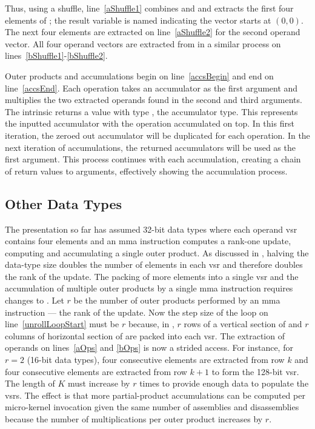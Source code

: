 \documentclass[\main/thesis.tex]{subfiles}
\begin{document}
Thus, using a shuffle, line~\ref{aShuffle1} combines  and  and extracts the first four elements of ; the result variable is named  indicating the vector starts at $(0, 0)$.
The next four elements are extracted on line~\ref{aShuffle2} for the second operand vector.
All four operand vectors are extracted from  in a similar process on lines~\ref{bShuffle1}-\ref{bShuffle2}.

Outer products and accumulations begin on line~\ref{accsBegin} and end on line~\ref{accsEnd}.
Each operation takes an accumulator as the first argument and multiplies the two extracted operands found in the second and third arguments.
The  intrinsic returns a value with type , the accumulator type.
This represents the inputted accumulator with the operation accumulated on top.
In this first iteration, the zeroed out accumulator will be duplicated for each operation.
In the next iteration of accumulations, the returned accumulators will be used as the first argument.
This process continues with each accumulation, creating a chain of return values to arguments, effectively showing the accumulation process.

\subsection{Other Data Types}
\label{sec:dataTypes}
The presentation so far has assumed 32-bit data types where each operand \gls{vsr} contains four elements and an \gls{mma} instruction computes a rank-one update, computing and accumulating a single outer product.
As discussed in , halving the data-type size doubles the number of elements in each \gls{vsr} and therefore doubles the rank of the update.
The packing of more elements into a single \gls{vsr} and the accumulation of multiple outer products by a single \gls{mma} instruction requires changes to .
Let $r$ be the number of outer products performed by an \gls{mma} instruction --- \ie the rank of the update.
Now the step size of the loop on line~\ref{unrollLoopStart} must be $r$ because, in , $r$ rows of a vertical section of  and $r$ columns of horizontal section of  are packed into each \gls{vsr}.
The extraction of operands on lines~\ref{aOps} and \ref{bOps} is now a strided access.
For instance, for $r=2$ (16-bit data types), four consecutive elements are extracted from row $k$ and four consecutive elements are extracted from row $k+1$ to form the 128-bit \gls{vsr}.
The length of $K$ must increase by $r$ times to provide enough data to populate the \glspl{vsr}.
The effect is that more partial-product accumulations can be computed per micro-kernel invocation given the same number of assemblies and disassemblies because the number of multiplications per outer product increases by $r$.
\end{document}
